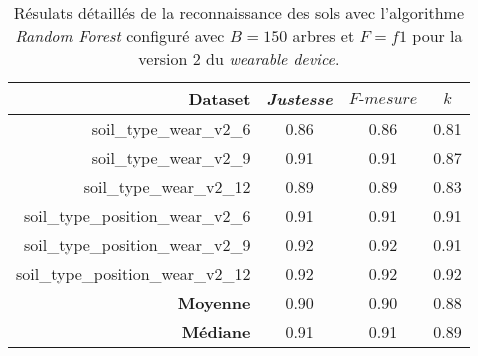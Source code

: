 \begin{table}[H]\renewcommand{\arraystretch}{0.5}
	\centering
	\caption{Résulats détaillés de la reconnaissance des sols avec l'algorithme \textit{Random Forest} configuré avec $B=150$ arbres et $F=f1$ pour la version 2 du \textit{wearable device}.}
	\label{tab:tab:rf-150-f1-wear-v2}
	\begin{tabular}{@{}rccc@{}}
		\toprule
			\textbf{Dataset} & \textit{Justesse} & $F\mbox{-} mesure$ & \textbf{$k$} \\
		\midrule
			soil\_type\_wear\_v2\_6 & 0.86 & 0.86 & 0.81 \\
			soil\_type\_wear\_v2\_9 & 0.91 & 0.91 & 0.87 \\
			soil\_type\_wear\_v2\_12 & 0.89 & 0.89 & 0.83 \\
			soil\_type\_position\_wear\_v2\_6 & 0.91 & 0.91 & 0.91 \\
			soil\_type\_position\_wear\_v2\_9 & 0.92 & 0.92 & 0.91 \\
			soil\_type\_position\_wear\_v2\_12 & 0.92 & 0.92 & 0.92 \\
			\textbf{Moyenne} & 0.90 & 0.90 & 0.88 \\
			\textbf{Médiane} & 0.91 & 0.91 & 0.89 \\
		\bottomrule
	\end{tabular}
\end{table}

